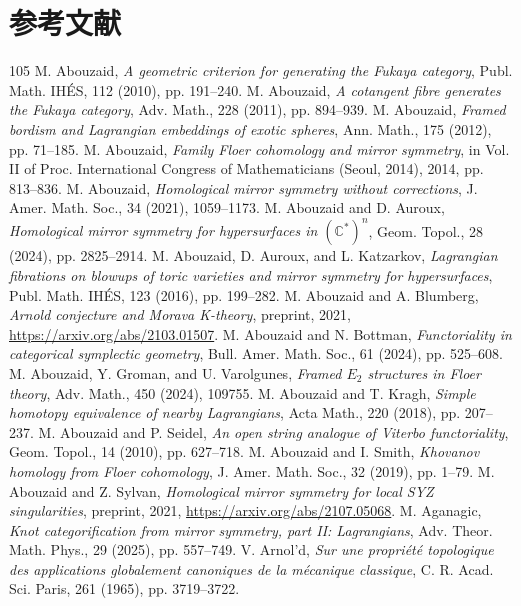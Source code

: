 \documentclass[UTF8,a4paper,11pt,fontset=windows]{ctexart}
\theoremstyle{cnthm}
\numberwithin{equation}{section}
\begin{document}
\section*{参考文献}
\begin{thebibliography}{105}
\small
 M. Abouzaid, \emph{A geometric criterion for generating the Fukaya category}, Publ. Math. IH\'ES, 112 (2010), pp. 191--240.
 M. Abouzaid, \emph{A cotangent fibre generates the Fukaya category}, Adv. Math., 228 (2011), pp. 894--939.
 M. Abouzaid, \emph{Framed bordism and Lagrangian embeddings of exotic spheres}, Ann. Math., 175 (2012), pp. 71--185.
 M. Abouzaid, \emph{Family Floer cohomology and mirror symmetry}, in Vol. II of Proc. International Congress of Mathematicians (Seoul, 2014), 2014, pp. 813--836.
 M. Abouzaid, \emph{Homological mirror symmetry without corrections}, J. Amer. Math. Soc., 34 (2021), 1059--1173.
 M. Abouzaid and D. Auroux, \emph{Homological mirror symmetry for hypersurfaces in $(\mathbb{C}^*)^n$}, Geom. Topol., 28 (2024), pp. 2825--2914.
 M. Abouzaid, D. Auroux, and L. Katzarkov, \emph{Lagrangian fibrations on blowups of toric varieties and mirror symmetry for hypersurfaces}, Publ. Math. IH\'ES, 123 (2016), pp. 199--282.
 M. Abouzaid and A. Blumberg, \emph{Arnold conjecture and Morava K-theory}, preprint, 2021, \url{https://arxiv.org/abs/2103.01507}.
 M. Abouzaid and N. Bottman, \emph{Functoriality in categorical symplectic geometry}, Bull. Amer. Math. Soc., 61 (2024), pp. 525--608.
 M. Abouzaid, Y. Groman, and U. Varolgunes, \emph{Framed $E_2$ structures in Floer theory}, Adv. Math., 450 (2024), 109755.
 M. Abouzaid and T. Kragh, \emph{Simple homotopy equivalence of nearby Lagrangians}, Acta Math., 220 (2018), pp. 207--237.
 M. Abouzaid and P. Seidel, \emph{An open string analogue of Viterbo functoriality}, Geom. Topol., 14 (2010), pp. 627--718.
 M. Abouzaid and I. Smith, \emph{Khovanov homology from Floer cohomology}, J. Amer. Math. Soc., 32 (2019), pp. 1--79.
 M. Abouzaid and Z. Sylvan, \emph{Homological mirror symmetry for local SYZ singularities}, preprint, 2021, \url{https://arxiv.org/abs/2107.05068}.
 M. Aganagic, \emph{Knot categorification from mirror symmetry, part II: Lagrangians}, Adv. Theor. Math. Phys., 29 (2025), pp. 557--749.
 V. Arnol'd, \emph{Sur une propri\'et\'e topologique des applications globalement canoniques de la m\'ecanique classique}, C. R. Acad. Sci. Paris, 261 (1965), pp. 3719--3722.

\end{thebibliography}
\end{document}
